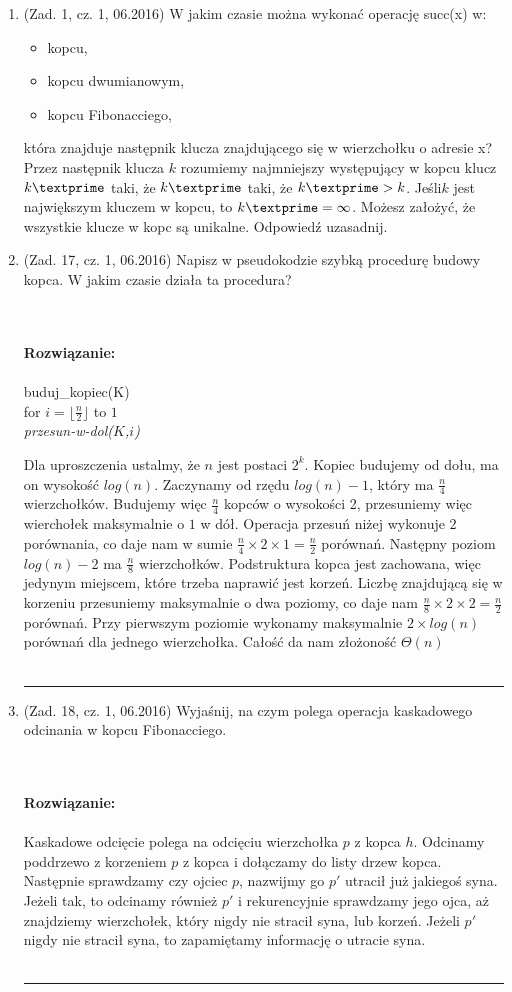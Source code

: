 \documentclass[10pt]{article}%
\newcommand{\beginsolution}{\textbf{\\~\\ \textbf{Rozwiązanie:} \\~\\}}
\newcommand{\finishsolution}{~\\~\\ \noindent\rule{11cm}{0.4pt}}
\begin{document}
\begin{enumerate}
\item (Zad. 1, cz. 1, 06.2016) W jakim czasie można wykonać operację succ(x) w:
\begin{itemize}
\item kopcu,
\item kopcu dwumianowym,
\item kopcu Fibonacciego,
\end{itemize}
która znajduje następnik klucza znajdującego się w wierzchołku o adresie x? Przez następnik klucza $k$ rozumiemy najmniejszy występujący w kopcu klucz $k\textprime$ taki, że $k\textprime$ taki, że $ k\textprime > k$. Jeśli$k$ jest największym kluczem w kopcu, to $k\textprime = \infty$. Możesz założyć, że wszystkie klucze w kopc są unikalne. Odpowiedź uzasadnij.

\item (Zad. 17, cz. 1, 06.2016) Napisz w pseudokodzie szybką procedurę budowy kopca. W jakim czasie działa ta procedura?

\beginsolution 
buduj_kopiec(K) \\
for $i=\lfloor\frac{n}{2}\rfloor$ to $1$ \\
\textit{przesun-w-dol($K$,$i$)} 

Dla uproszczenia ustalmy, że $n$ jest postaci $2^k$.
Kopiec budujemy od dołu, ma on wysokość $log(n)$. Zaczynamy od rzędu $log(n)-1$, który ma $\frac{n}{4}$ wierzchołków. Budujemy więc $\frac{n}{4}$ kopców o wysokości 2, przesuniemy więc wierchołek maksymalnie o $1$ w dół. Operacja przesuń niżej wykonuje $2$ porównania, co daje nam w sumie $\frac{n}{4} \times 2 \times 1 = \frac{n}{2}$ porównań. Następny poziom $log(n)-2$ ma $\frac{n}{8}$ wierzchołków. Podstruktura kopca jest zachowana, więc jedynym miejscem, które trzeba naprawić jest korzeń. Liczbę znajdującą się w korzeniu przesuniemy maksymalnie o dwa poziomy, co daje nam $\frac{n}{8} \times 2 \times 2 = \frac{n}{2}$ porównań. Przy pierwszym poziomie wykonamy maksymalnie $2 \times log(n)$ porównań dla jednego wierzchołka. Całość da nam złożoność $\Theta(n)$
\finishsolution

\item (Zad. 18, cz. 1, 06.2016) Wyjaśnij, na czym polega operacja kaskadowego odcinania w kopcu Fibonacciego.

\beginsolution
Kaskadowe odcięcie polega na odcięciu wierzchołka $p$ z kopca $h$. Odcinamy poddrzewo z korzeniem $p$ z kopca i dołączamy do listy drzew kopca. Następnie sprawdzamy czy ojciec $p$, nazwijmy go $p'$ utracił już jakiegoś syna. Jeżeli tak, to odcinamy również $p'$ i rekurencyjnie sprawdzamy jego ojca, aż znajdziemy wierzchołek, który nigdy nie stracił syna, lub korzeń. Jeżeli $p'$ nigdy nie stracił syna, to zapamiętamy informację o utracie syna.
\finishsolution


\end{enumerate}
\end{document}
